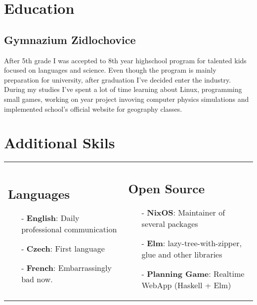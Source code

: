 \documentclass[9pt]{article}
\begin{document}
\section{Education}

\subsection{Gymnazium Zidlochovice}

After 5th grade I was accepted to 8th year highschool program for talented kids focused on languages and science.
Even though the program is mainly preparation for university, after graduation I've decided enter
the industry. During my studies I've spent a lot of time learning about Linux, programming small
games, working on year project invoving computer physics simulations and implemented school's
official website for geography classes.

\section{Additional Skils}

\vspace{-0.3cm}
\begin{tabular}{@{}ll}
  \begin{minipage}[t]{0.5\textwidth}
      \subsection{Languages}
      \begin{itemize}[leftmargin=0.3cm]

        \item[-] \textbf{English}: Daily professional communication
        \item[-] \textbf{Czech}: First language
        \item[-] \textbf{French}: Embarrassingly bad now.

      \end{itemize}
  \end{minipage}
  & \begin{minipage}[t]{0.5\textwidth}
      \subsection{Open Source}
      \begin{itemize}[leftmargin=0.3cm]

        \item[-] \textbf{NixOS}: Maintainer of several packages
        \item[-] \textbf{Elm}: lazy-tree-with-zipper, glue and other libraries
        \item[-] \textbf{Planning Game}: Realtime WebApp (Haskell + Elm)

      \end{itemize}
  \end{minipage} \\
\end{tabular}
\end{document}
